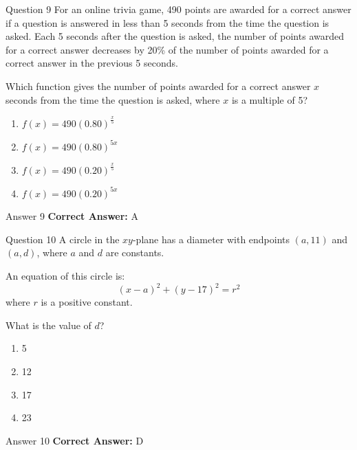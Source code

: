 \documentclass{beamer}
\begin{document}
\begin{frame}{Question 9}
\small
For an online trivia game, 490 points are awarded for a correct answer if a question is answered in less than 5 seconds from the time the question is asked.  
Each 5 seconds after the question is asked, the number of points awarded for a correct answer decreases by 20\% of the number of points awarded for a correct answer in the previous 5 seconds.  

Which function gives the number of points awarded for a correct answer \(x\) seconds from the time the question is asked, where \(x\) is a multiple of 5?
\vspace{0.35cm}
\begin{enumerate}
    \item[A.] $f(x) = 490(0.80)^{\frac{x}{5}}$
    \item[B.] $f(x) = 490(0.80)^{5x}$
    \item[C.] $f(x) = 490(0.20)^{\frac{x}{5}}$
    \item[D.] $f(x) = 490(0.20)^{5x}$
\end{enumerate}
\end{frame}
\begin{frame}{Answer 9}
\small
\textbf{Correct Answer:} A
\end{frame}

\begin{frame}{Question 10}
\small
A circle in the \(xy\)-plane has a diameter with endpoints \((a,11)\) and \((a,d)\), where \(a\) and \(d\) are constants.  

An equation of this circle is:  
\[
(x - a)^2 + (y - 17)^2 = r^2
\]  
where \(r\) is a positive constant.

What is the value of \(d\)?
\vspace{0.35cm}
\begin{enumerate}
    \item[A.] 5
    \item[B.] 12
    \item[C.] 17
    \item[D.] 23
\end{enumerate}
\end{frame}
\begin{frame}{Answer 10}
\small
\textbf{Correct Answer:} D
\end{frame}
\end{document}
